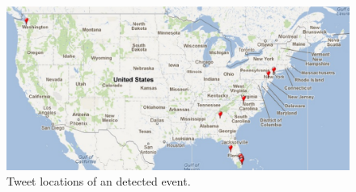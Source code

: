 


\begin{figure}
\centering
\includegraphics[width=0.6\columnwidth]{Figs/miami.eps}
\caption{
Tweet locations of an detected event.}
\label{fig:miami}
\end{figure}

